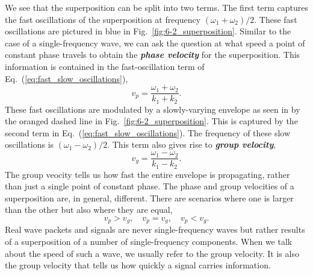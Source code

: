 We see that the superposition can be split into two terms.
The first term captures the fast oscillations of the superposition at frequency $(\omega_1+\omega_2)/2$.
These fast oscillations are pictured in blue in Fig.~\ref{fig:6-2_superposition}.
Similar to the case of a single-frequency wave, we can ask the question at what speed a point of constant phase travels to obtain the \textit{\textbf{phase velocity}} for the superposition.
This information is contained in the fast-oscillation term of Eq.~(\ref{eq:fast_slow_oscillations}),
\begin{equation}
    v_p = \frac{\omega_1 + \omega_2}{k_1 + k_2}.
\end{equation}
These fast oscillations are modulated by a slowly-varying envelope as seen in by the oranged dashed line in Fig.~\ref{fig:6-2_superposition}.
This is captured by the second term in Eq.~(\ref{eq:fast_slow_oscillations}).
The frequency of these slow oscillations is $(\omega_1-\omega_2)/2$.
This term also gives rise to \textit{\textbf{group velocity}},
\begin{equation}
    v_g = \frac{\omega_1 - \omega_2}{k_1 - k_2}.
\end{equation}
The group veocity tells us how fast the entire envelope is propagating, rather than just a single point of constant phase.
The phase and group velocities of a superposition are, in general, different.
There are scenarios where one is larger than the other but also where they are equal,
\begin{equation}
    v_p > v_g, \quad v_p = v_g, \quad v_p < v_g.
\end{equation}
Real wave packets and signals are never single-frequency waves but rather results of a superposition of a number of single-frequency components.
When we talk about the speed of such a wave, we usually refer to the group velocity.
It is also the group velocity that tells us how quickly a signal carries information.

